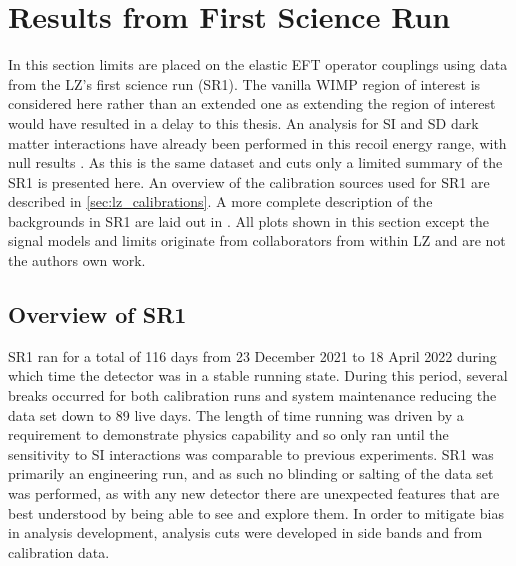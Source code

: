 \section{Results from First Science Run}
\par
In this section limits are placed on the elastic EFT operator couplings using data from the LZ's first science run (SR1).
The vanilla WIMP region of interest is considered here rather than an extended one as extending the region of interest would have resulted in a delay to this thesis.
An analysis for SI and SD dark matter interactions have already been performed in this recoil energy range, with null results \cite{lz_ws_sr1_ref}.
As this is the same dataset and cuts only a limited summary of the SR1 is presented here.
An overview of the calibration sources used for SR1 are described in \autoref{sec:lz_calibrations}.
A more complete description of the backgrounds in SR1 are laid out in \cite{lz_sr1_backgrounds_ref}.
All plots shown in this section except the signal models and limits originate from collaborators from within LZ and are not the authors own work.

\subsection{Overview of SR1}
\par
SR1 ran for a total of 116 days from 23 December 2021 to 18 April 2022 during which time the detector was in a stable running state.
During this period, several breaks occurred for both calibration runs and system maintenance reducing the data set down to 89 live days.
The length of time running was driven by a requirement to demonstrate physics capability and so only ran until the sensitivity to SI interactions was comparable to previous experiments.
SR1 was primarily an engineering run, and as such no blinding or salting of the data set was performed, as with any new detector there are unexpected features that are best understood by being able to see and explore them.
In order to mitigate bias in analysis development, analysis cuts were developed in side bands and from calibration data.

